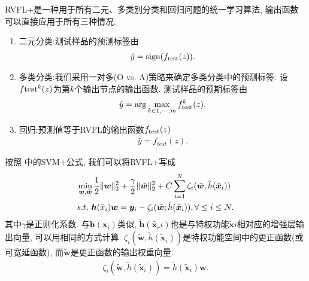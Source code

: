 RVFL+是一种用于所有二元、多类别分类和回归问题的统一学习算法, 输出函数可以直接应用于所有三种情况.
\begin{enumerate}
    \item 二元分类:测试样品的预测标签由
\begin{align}
    \hat y = \textup{sign}(f_{\textup{test}}(z)).
\end{align}
    \item 多类分类:我们采用一对多(O vs. A)策略来确定多类分类中的预测标签. 设$f{\textup{test}}^k(z)$为第$k$个输出节点的输出函数. 测试样品的预期标签由
\begin{align}
    \hat y = \arg \max_{ k \in 1,\cdots,m} f_{\textup{test}}^k (z).
\end{align}
  \item  回归:预测值等于RVFL的输出函数$f_{\textup{test}}(z)$
\begin{align}
    \hat y = f_{test}(z).
\end{align}
\end{enumerate}

按照 \cite{VAPNIK2009544} 中的SVM+公式, 我们可以将RVFL+写成
\begin{align}
    &\min\limits_{{\bm w},\tilde {\bm w}} \frac 1 2 \|{\bm w}\|_2^ 2 + \frac \gamma 2 \|\tilde {\bm w}\|_2^ 2 + C\sum_{i=1}^N \zeta_i (\tilde {\bm w}, {\tilde h}({\tilde {\bm x}}_i))\notag\\
    &s.t.\,\, \bm h(\tilde x_i){\bm w} = \bm y_i - \zeta_i (\tilde {\bm w}; {\tilde h}({\tilde {\bm x}}_i)), \forall \leq i \leq  N.\label{RVFL20181102eq8}
\end{align}
其中$\gamma$是正则化系数. 与$\bm h(\bm x_i)$类似, ${\tilde{\bm h}}({\tilde{\bm x_r}}i)$也是与特权功能${\tilde{\bm x}}i$相对应的增强层输出向量, 可以用相同的方式计算.
$\zeta_i(\tilde{\bm w},{\tilde h}(\tilde{\bm x}_i))$是特权功能空间中的更正函数(或可宽延函数), 而$\tilde{\bm w}$是更正函数的输出权重向量.
\begin{align}\label{RVFL20181102eq9}
    \zeta_i (\tilde {\bm w}, {\tilde h}({\tilde {\bm x}}_i)) = {\tilde h}({\tilde {\bm x}}_i){\bm w}.
\end{align}

